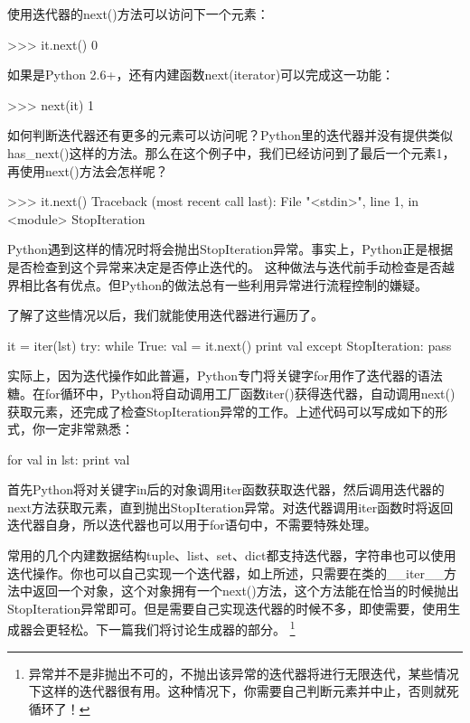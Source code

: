\documentclass[12pt,a4paper]{report}
\begin{document}
使用迭代器的next()方法可以访问下一个元素：
\begin{python}[moreemph={[4]42},caption={},label=ex1]
>>> it.next()
0
\end{python}

如果是Python 2.6+，还有内建函数next(iterator)可以完成这一功能：
\begin{python}[moreemph={[4]42},caption={},label=ex1]
>>> next(it)
1
\end{python}

如何判断迭代器还有更多的元素可以访问呢？Python里的迭代器并没有提供类似has\_next()这样的方法。那么在这个例子中，我们已经访问到了最后一个元素1，再使用next()方法会怎样呢？
\begin{python}[moreemph={[4]42},caption={},label=ex1]
>>> it.next()
Traceback (most recent call last):
  File "<stdin>", line 1, in <module>
StopIteration
\end{python}

Python遇到这样的情况时将会抛出StopIteration异常。事实上，Python正是根据是否检查到这个异常来决定是否停止迭代的。
这种做法与迭代前手动检查是否越界相比各有优点。但Python的做法总有一些利用异常进行流程控制的嫌疑。

了解了这些情况以后，我们就能使用迭代器进行遍历了。
\begin{python}[moreemph={[4]42},caption={},label=ex1]
it = iter(lst)
try:
    while True:
        val = it.next()
        print val
except StopIteration:
    pass
\end{python}

实际上，因为迭代操作如此普遍，Python专门将关键字for用作了迭代器的语法糖。在for循环中，Python将自动调用工厂函数iter()获得迭代器，自动调用next()获取元素，还完成了检查StopIteration异常的工作。上述代码可以写成如下的形式，你一定非常熟悉：
\begin{python}[moreemph={[4]42},caption={},label=ex1]
for val in lst:
    print val
\end{python}

首先Python将对关键字in后的对象调用iter函数获取迭代器，然后调用迭代器的next方法获取元素，直到抛出StopIteration异常。对迭代器调用iter函数时将返回迭代器自身，所以迭代器也可以用于for语句中，不需要特殊处理。

常用的几个内建数据结构tuple、list、set、dict都支持迭代器，字符串也可以使用迭代操作。你也可以自己实现一个迭代器，如上所述，只需要在类的\_\_iter\_\_方法中返回一个对象，这个对象拥有一个next()方法，这个方法能在恰当的时候抛出StopIteration异常即可。但是需要自己实现迭代器的时候不多，即使需要，使用生成器会更轻松。下一篇我们将讨论生成器的部分。
\footnote{异常并不是非抛出不可的，不抛出该异常的迭代器将进行无限迭代，某些情况下这样的迭代器很有用。这种情况下，你需要自己判断元素并中止，否则就死循环了！}
\end{document}

